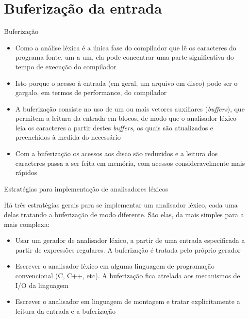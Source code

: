 \section{Buferização da entrada}

\begin{frame}[fragile]{Buferização}

    \begin{itemize}
        \item Como a análise léxica é a única fase do compilador que lê os caracteres do programa fonte, um a um, ela pode concentrar uma parte significativa
            do tempo de execução do compilador

        \item Isto porque o acesso à entrada (em geral, um arquivo em disco) pode ser o gargalo, em termos de performance, do compilador

        \item A buferização consiste no uso de um ou mais vetores auxiliares (\textit{buffers}), que permitem a leitura da entrada em blocos, de modo que o analisador léxico
            leia os caracteres a partir destes \textit{buffers}, os quais são atualizados e preenchidos à medida do necessário

        \item Com a buferização os acessos aos disco são reduzidos e a leitura dos caracteres passa a ser feita em memória, com acessos consideravelmente mais
            rápidos
    \end{itemize}

\end{frame}
\begin{frame}[fragile]{Estratégias para implementação de analisadores léxicos}

    Há três estratégias gerais para se implementar um analisador léxico, cada uma delas tratando a buferização de modo diferente. São elas, da mais
    simples para a mais complexa:
    \begin{itemize}
        \item Usar um gerador de analisador léxico, a partir de uma entrada especificada a partir de expressões regulares. A buferização é tratada pelo próprio
            gerador

        \item Escrever o analisador léxico em alguma linguagem de programação convencional (C, C++, etc). A buferização fica atrelada aos mecanismos de I/O da linguagem

        \item Escrever o analisador em linguagem de montagem e tratar explicitamente a leitura da entrada e a buferização
    \end{itemize}

\end{frame}

